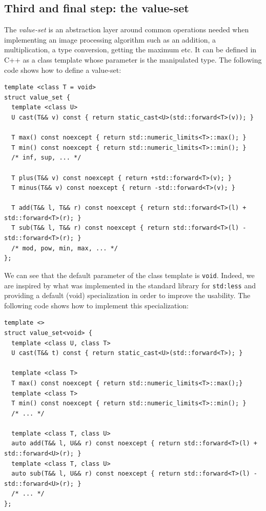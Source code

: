\subsection{Third and final step: the value-set}

The \emph{value-set} is an abstraction layer around common operations needed when implementing an image processing
algorithm such as an addition, a multiplication, a type conversion, getting the maximum etc. It can be defined in C++ as
a class template whose parameter is the manipulated type. The following code shows how to define a value-set:

\begin{verbatim}
template <class T = void>
struct value_set {
  template <class U>
  U cast(T&& v) const { return static_cast<U>(std::forward<T>(v)); }

  T max() const noexcept { return std::numeric_limits<T>::max(); }
  T min() const noexcept { return std::numeric_limits<T>::min(); }
  /* inf, sup, ... */

  T plus(T&& v) const noexcept { return +std::forward<T>(v); }
  T minus(T&& v) const noexcept { return -std::forward<T>(v); }

  T add(T&& l, T&& r) const noexcept { return std::forward<T>(l) + std::forward<T>(r); }
  T sub(T&& l, T&& r) const noexcept { return std::forward<T>(l) - std::forward<T>(r); }
  /* mod, pow, min, max, ... */
};
\end{verbatim}

We can see that the default parameter of the class template is \texttt{void}. Indeed, we are inspired by what was
implemented in the standard library for \texttt{std:less} and providing a default (void) specialization in order to
improve the usability. The following code shows how to implement this specialization:

\begin{verbatim}
template <>
struct value_set<void> {
  template <class U, class T>
  U cast(T&& t) const { return static_cast<U>(std::forward<T>); }

  template <class T>
  T max() const noexcept { return std::numeric_limits<T>::max();}
  template <class T>
  T min() const noexcept { return std::numeric_limits<T>::min(); }
  /* ... */

  template <class T, class U>
  auto add(T&& l, U&& r) const noexcept { return std::forward<T>(l) + std::forward<U>(r); }
  template <class T, class U>
  auto sub(T&& l, U&& r) const noexcept { return std::forward<T>(l) - std::forward<U>(r); }
  /* ... */
};
\end{verbatim}

